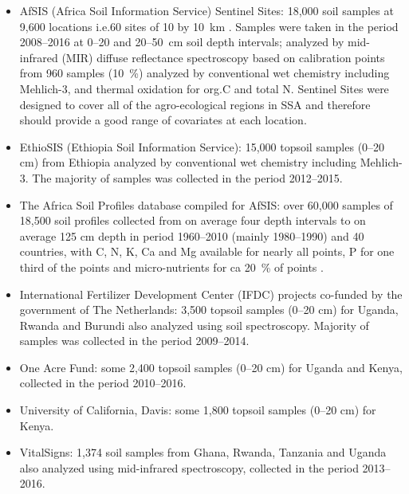 \begin{linenumbers}
\begin{itemize}
  \item AfSIS (Africa Soil Information Service) Sentinel Sites: 18,000 soil samples at 9,600 locations i.e.\@ 60 sites of 10 by \SI{10}{\kilo\metre} \citep{WalshVagen2006AfSIS,Vagen2010AfSIS}. Samples were taken in the period 2008--2016 at 0--20 and 20--\SI{50}{\centi\metre} soil depth intervals; analyzed by mid-infrared (MIR) diffuse reflectance spectroscopy based on calibration points from 960 samples (\SI{10}{\percent}) analyzed by conventional wet chemistry including Mehlich-3, and thermal oxidation for org.\@ C and total \@ N. Sentinel Sites were designed to cover all of the agro-ecological regions in SSA and therefore should provide a good range of covariates at each location.
  \item EthioSIS (Ethiopia Soil Information Service): 15,000 topsoil samples (0--20 cm) from Ethiopia analyzed by conventional wet chemistry including Mehlich-3. The majority of samples was collected in the period 2012--2015.
  \item The Africa Soil Profiles database compiled for AfSIS: over 60,000 samples of 18,500 soil profiles collected from on average four depth intervals to on average 125 cm depth in period 1960--2010 (mainly 1980--1990) and 40 countries, with C, N, K, Ca and Mg available for nearly all points, P for one third of the points and micro-nutrients for ca \SI{20}{\percent} of points \citep{leenaars2012africa}.
  \item International Fertilizer Development Center (IFDC) projects co-funded by the government of The Netherlands: 3,500 topsoil samples (0--20 cm) for Uganda, Rwanda and Burundi also analyzed using soil spectroscopy. Majority of samples was collected in the period 2009--2014.
  \item One Acre Fund: some 2,400 topsoil samples (0--20 cm) for Uganda and Kenya, collected in the period 2010--2016.
  \item University of California, Davis: some 1,800 topsoil samples (0--20 cm) for Kenya.
  \item VitalSigns: 1,374 soil samples from Ghana, Rwanda, Tanzania and Uganda also analyzed using mid-infrared spectroscopy, collected in the period 2013--2016.
\end{itemize}



\end{linenumbers}
